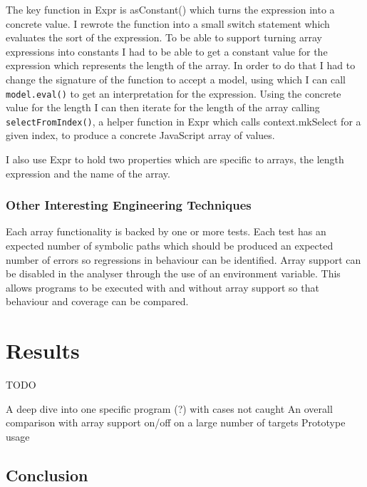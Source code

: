 \documentclass[]{final_report}
\begin{document}
The key function in Expr is asConstant() which turns the expression into a concrete value. I rewrote the function into a small switch statement which evaluates the sort of the expression. To be able to support turning array expressions into constants I had to be able to get a constant value for the expression which represents the length of the array. In order to do that I had to change the signature of the function to accept a model, using which I can call \lstinline{model.eval()} to get an interpretation for the expression. Using the concrete value for the length I can then iterate for the length of the array calling \lstinline{selectFromIndex()}, a helper function in Expr which calls context.mkSelect for a given index, to produce a concrete JavaScript array of values.

I also use Expr to hold two properties which are specific to arrays, the length expression and the name of the array.

\subsection{Other Interesting Engineering Techniques}
Each array functionality is backed by one or more tests. Each test has an expected number of symbolic paths which should be produced an expected number of errors so regressions in behaviour can be identified. Array support can be disabled in the analyser through the use of an environment variable. This allows programs to be executed with and without array support so that behaviour and coverage can be compared.


\chapter{Results}

TODO

A deep dive into one specific program (?) with cases not caught
An overall comparison with array support on/off on a large number of targets
Prototype usage

\section{Conclusion}

\newpage


\label{endpage}
\end{document}

